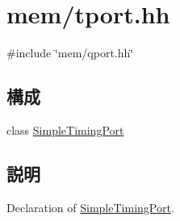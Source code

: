\hypertarget{tport_8hh}{
\section{mem/tport.hh}
\label{tport_8hh}
}
{\ttfamily \#include \char`\"{}mem/qport.hh\char`\"{}}\par
\subsection*{構成}
\begin{DoxyCompactItemize}
\item 
class \hyperlink{classSimpleTimingPort}{SimpleTimingPort}
\end{DoxyCompactItemize}


\subsection{説明}
Declaration of \hyperlink{classSimpleTimingPort}{SimpleTimingPort}. 